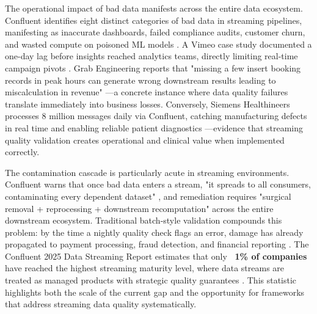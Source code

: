 The operational impact of bad data manifests across the entire data ecosystem. Confluent identifies eight distinct categories of bad data in streaming pipelines, manifesting as inaccurate dashboards, failed compliance audits, customer churn, and wasted compute on poisoned ML models \cite{confluent_2025}. A Vimeo case study documented a one-day lag before insights reached analytics teams, directly limiting real-time campaign pivots \cite{confluent_2025}. Grab Engineering reports that "missing a few insert booking records in peak hours can generate wrong downstream results leading to miscalculation in revenue" \cite{grab_streaming_dq}---a concrete instance where data quality failures translate immediately into business losses. Conversely, Siemens Healthineers processes 8 million messages daily via Confluent, catching manufacturing defects in real time and enabling reliable patient diagnostics \cite{confluent_2025}---evidence that streaming quality validation creates operational and clinical value when implemented correctly.

The contamination cascade is particularly acute in streaming environments. Confluent warns that once bad data enters a stream, "it spreads to all consumers, contaminating every dependent dataset" \cite{confluent_2025}, and remediation requires "surgical removal + reprocessing + downstream recomputation" across the entire downstream ecosystem. Traditional batch-style validation compounds this problem: by the time a nightly quality check flags an error, damage has already propagated to payment processing, fraud detection, and financial reporting \cite{confluent_2025}. The Confluent 2025 Data Streaming Report estimates that only \textbf{~1\% of companies} have reached the highest streaming maturity level, where data streams are treated as managed products with strategic quality guarantees \cite{confluent_2025_streaming_report}. This statistic highlights both the scale of the current gap and the opportunity for frameworks that address streaming data quality systematically.

